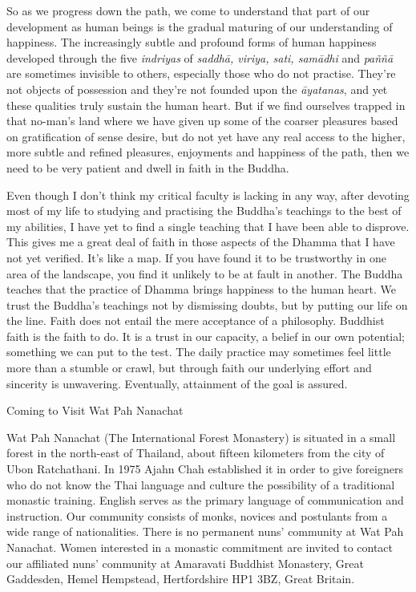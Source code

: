 So as we progress down the path, we come to understand that part of our
development as human beings is the gradual maturing of our understanding
of happiness. The increasingly subtle and profound forms of human
happiness developed through the five \emph{indriyas} of \emph{saddhā,
viriya, sati, samādhi} and \emph{paññā} are sometimes invisible to
others, especially those who do not practise. They're not objects of
possession and they're not founded upon the \emph{āyatanas}, and yet
these qualities truly sustain the human heart. But if we find ourselves
trapped in that no-man's land where we have given up some of the coarser
pleasures based on gratification of sense desire, but do not yet have
any real access to the higher, more subtle and refined pleasures,
enjoyments and happiness of the path, then we need to be very patient
and dwell in faith in the Buddha.

Even though I don't think my critical faculty is lacking in any way,
after devoting most of my life to studying and practising the Buddha's
teachings to the best of my abilities, I have yet to find a single
teaching that I have been able to disprove. This gives me a great deal
of faith in those aspects of the Dhamma that I have not yet verified.
It's like a map. If you have found it to be trustworthy in one area of
the landscape, you find it unlikely to be at fault in another. The
Buddha teaches that the practice of Dhamma brings happiness to the human
heart. We trust the Buddha's teachings not by dismissing doubts, but by
putting our life on the line. Faith does not entail the mere acceptance
of a philosophy. Buddhist faith is the faith to do. It is a trust in our
capacity, a belief in our own potential; something we can put to the
test. The daily practice may sometimes feel little more than a stumble
or crawl, but through faith our underlying effort and sincerity is
unwavering. Eventually, attainment of the goal is assured.





Coming to Visit Wat Pah Nanachat

Wat Pah Nanachat (The International Forest Monastery) is situated in a
small forest in the north-east of Thailand, about fifteen kilometers
from the city of Ubon Ratchathani. In 1975 Ajahn Chah established it in
order to give foreigners who do not know the Thai language and culture
the possibility of a traditional monastic training. English serves as
the primary language of communication and instruction. Our community
consists of monks, novices and postulants from a wide range of
nationalities. There is no permanent nuns' community at Wat Pah
Nanachat. Women interested in a monastic commitment are invited to
contact our affiliated nuns' community at Amaravati Buddhist Monastery,
Great Gaddesden, Hemel Hempstead, Hertfordshire HP1 3BZ, Great Britain.

